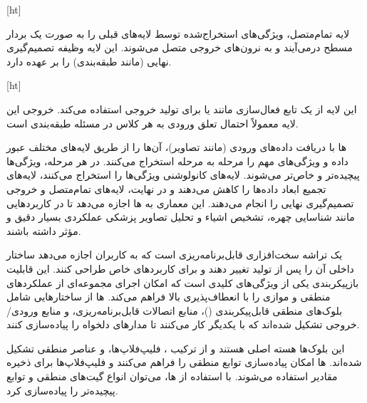 [ht]



لایه تمام‌متصل، ویژگی‌های استخراج‌شده توسط لایه‌های قبلی را به صورت یک بردار مسطح درمی‌آیند و به نرون‌های خروجی متصل می‌شوند. این لایه وظیفه تصمیم‌گیری نهایی (مانند طبقه‌بندی) را بر عهده دارد.

[ht]



این لایه از یک تابع فعال‌سازی مانند  یا  برای تولید خروجی استفاده می‌کند. خروجی این لایه معمولاً احتمال تعلق ورودی به هر کلاس در مسئله طبقه‌بندی است.





ها
با دریافت داده‌های ورودی (مانند تصاویر)، آن‌ها را از طریق لایه‌های مختلف عبور داده و ویژگی‌های مهم را مرحله به مرحله استخراج می‌کنند. در هر مرحله، ویژگی‌ها پیچیده‌تر و خاص‌تر می‌شوند. لایه‌های کانولوشنی ویژگی‌ها را استخراج می‌کنند، لایه‌های تجمیع ابعاد داده‌ها را کاهش می‌دهند و در نهایت، لایه‌های تمام‌متصل و خروجی تصمیم‌گیری نهایی را انجام می‌دهند. این معماری به ‌ها اجازه می‌دهد تا در کاربردهایی مانند شناسایی چهره، تشخیص اشیاء و تحلیل تصاویر پزشکی عملکردی بسیار دقیق و مؤثر داشته باشند.





یک تراشه سخت‌افزاری قابل‌برنامه‌ریزی است که به کاربران اجازه می‌دهد ساختار داخلی آن را پس از تولید تغییر دهند و برای کاربردهای خاص طراحی کنند. این قابلیت بازپیکربندی یکی از ویژگی‌های کلیدی  است که امکان اجرای مجموعه‌ای از عملکردهای منطقی و موازی را با انعطاف‌پذیری بالا فراهم می‌کند. ‌ها از ساختارهایی شامل بلوک‌های منطقی قابل‌پیکربندی ()، منابع اتصالات قابل‌برنامه‌ریزی، و منابع ورودی/خروجی تشکیل شده‌اند که با یکدیگر کار می‌کنند تا مدارهای دلخواه را پیاده‌سازی کنند.




این بلوک‌ها هسته اصلی  هستند و از ترکیب ، فلیپ‌فلاپ‌ها، و عناصر منطقی تشکیل شده‌اند. ها امکان پیاده‌سازی توابع منطقی را فراهم می‌کنند و فلیپ‌فلاپ‌ها برای ذخیره مقادیر استفاده می‌شوند. با استفاده از ها، می‌توان انواع گیت‌های منطقی و توابع پیچیده‌تر را پیاده‌سازی کرد.

